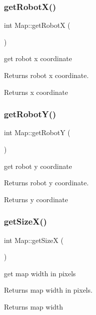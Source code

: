 \subsubsection{\texorpdfstring{get\+Robot\+X()}{getRobotX()}}
{\footnotesize\ttfamily int Map\+::get\+RobotX (\begin{DoxyParamCaption}{ }\end{DoxyParamCaption})}



get robot x coordinate 

Returns robot x coordinate.

\begin{DoxyReturn}{Returns}
x coordinate 
\end{DoxyReturn}
\mbox{\label{classMap_a86363f86d8b4a1347d2b49fa389a6c8b}} 
\subsubsection{\texorpdfstring{get\+Robot\+Y()}{getRobotY()}}
{\footnotesize\ttfamily int Map\+::get\+RobotY (\begin{DoxyParamCaption}{ }\end{DoxyParamCaption})}



get robot y coordinate 

Returns robot y coordinate.

\begin{DoxyReturn}{Returns}
y coordinate 
\end{DoxyReturn}
\mbox{\label{classMap_a8f98d27258db448abb49b93be0d8149f}} 
\subsubsection{\texorpdfstring{get\+Size\+X()}{getSizeX()}}
{\footnotesize\ttfamily int Map\+::get\+SizeX (\begin{DoxyParamCaption}{ }\end{DoxyParamCaption})}



get map width in pixels 

Returns map width in pixels.

\begin{DoxyReturn}{Returns}
map width 
\end{DoxyReturn}
\mbox{\label{classMap_a910e3822a911ba31cdc4d0d9d722b5a0}} 

